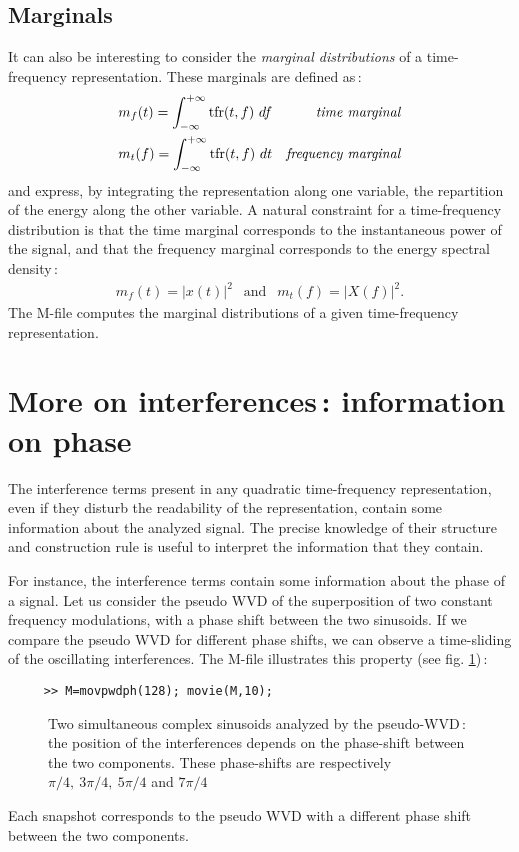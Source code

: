 \subsection{Marginals}
 It can also be interesting to consider the {\it marginal
distributions} of a time-frequency representation. These marginals are
defined as\,:
\begin{eqnarray*}
m_f(t)=\int_{-\infty}^{+\infty} \mbox{tfr}(t,f)\ df && \mbox{\it time
marginal}\\ 
m_t(f)=\int_{-\infty}^{+\infty} \mbox{tfr}(t,f)\ dt && \mbox{\it frequency
marginal} 
\end{eqnarray*}
and express, by integrating the representation along one variable, the
repartition of the energy along the other variable. A natural
constraint for a time-frequency distribution is that the time marginal
corresponds to the instantaneous power of the signal, and that the
frequency marginal corresponds to the energy spectral density\,:
\begin{eqnarray*}
m_f(t)=|x(t)|^2\ \ \mbox{ and }\ \ m_t(f)=|X(f)|^2.	
\end{eqnarray*}
The M-file  computes the
marginal distributions of a given time-frequency representation.


\section{More on interferences\,: information on phase}
  The interference terms present in any quadratic time-frequency
representation, even if they disturb the readability of the
representation, contain some information about the analyzed
signal. The precise knowledge of their structure and construction rule
is useful to interpret the information that they contain. 

  For instance, the interference terms contain some information about the
phase of a signal. Let us consider the pseudo WVD of the superposition of
two constant frequency modulations, with a phase shift between the two
sinusoids. If we compare the pseudo WVD for different phase shifts, we can
observe a time-sliding of the oscillating interferences. The M-file
 illustrates this property
(see fig. \ref{Ex1fig1})\,:
\begin{verbatim}
     >> M=movpwdph(128); movie(M,10);
\end{verbatim}
\begin{figure}[htb]
\epsfxsize=10cm
\epsfysize=10cm
\centerline{}
\caption{\label{Ex1fig1}Two simultaneous complex sinusoids analyzed by the
pseudo-WVD\,: the position of the interferences depends on the phase-shift
between the two components. These phase-shifts are respectively $\pi/4,\
3\pi/4,\ 5\pi/4$ and $7\pi/4$} 
\end{figure}
Each snapshot corresponds to the pseudo WVD with a different phase
shift between the two components. 

